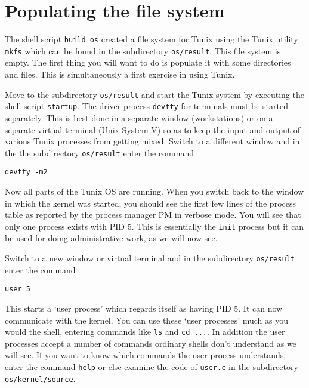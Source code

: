 \section{Populating the file system}
\noindent

The shell script {\tt build\_os} created a
file system for Tunix using the Tunix utility {\tt mkfs}
which can be found in the subdirectory {\tt os/result}.
This file system is empty. The first thing you will
want to do is populate it with some directories and
files. This is simultaneously a first exercise in
using Tunix.


Move to the subdirectory {\tt os/result} and start
the Tunix system by executing the shell script
{\tt startup}. The driver process {\tt devtty}
for terminals must be started separately. This
is best done in a separate window (workstations)
or on a separate virtual terminal (Unix System V)
so as to keep the input and output of various
Tunix processes from getting mixed. Switch to
a different window and in the the subdirectory
{\tt os/result} enter the command
\begin{verbatim}
devtty -m2
\end{verbatim}


Now all parts of the Tunix OS are running. When
you switch back to the window in which the
kernel was started, you should see the first
few lines of the process table as reported
by the process manager PM in verbose mode.
You will see that only one process exists
with PID 5. This is essentially the {\tt init}
process but it can be used for doing
administrative work, as we will now see.


Switch to a new window or virtual terminal
and in the subdirectory {\tt os/result}
enter the command
\begin{verbatim}
user 5
\end{verbatim}
This starts a `user process' which regards
itself as having PID 5. It can now communicate
with the kernel. You can use these `user processes'
much as you would the shell, entering commands
like {\tt ls} and {\tt cd ...}. In addition
the user processes accept a number of commands
ordinary shells don't understand as we will see.
If you want to know which commands the user
process understands, enter the command {\tt help}
or else examine the code of {\tt user.c} in
the subdirectory {\tt os/kernel/source}.

